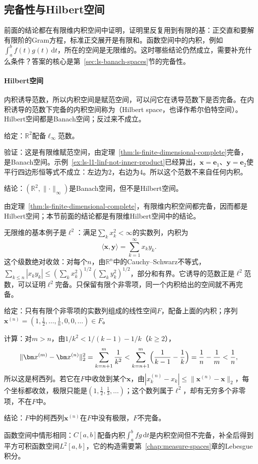 \subsection{完备性与Hilbert空间}
\label{sec:ls-hilbert-spaces}

前面的结论都在有限维内积空间中证明，证明里反复用到有限的基：正交直和要解有限阶的Gram方程，标准正交展开是有限和。函数空间中的内积，例如$\int_a^bf(t)g(t)\,\mathrm dt$，所在的空间是无限维的。这时哪些结论仍然成立，需要补充什么条件？答案的核心是第~\ref{sec:ls-banach-spaces}节的完备性。

\paragraph{Hilbert空间}
内积诱导范数，所以内积空间是赋范空间，可以问它在诱导范数下是否完备。在内积诱导的范数下完备的内积空间称为（Hilbert space，也译作希尔伯特空间）。Hilbert空间都是Banach空间；反过来不成立。
\begin{example}[反例：完备但不来自内积的范数]
\label{ex:ls-banach-not-hilbert}
给定：$\mathbb R^2$配备$\ell_\infty$范数。

验证：这是有限维赋范空间，由定理~\ref{thm:ls-finite-dimensional-complete}完备，是Banach空间。示例~\ref{ex:ls-l1-linf-not-inner-product}已经算出，$\bm x=\bm e_1$、$\bm y=\bm e_2$使平行四边形恒等式不成立：左边为$2$，右边为$4$。所以这个范数不来自任何内积。

结论：$(\mathbb R^2,\lVert\cdot\rVert_\infty)$是Banach空间，但不是Hilbert空间。
\end{example}
由定理~\ref{thm:ls-finite-dimensional-complete}，有限维内积空间都完备，因而都是Hilbert空间；本节前面的结论都是有限维Hilbert空间中的结论。

无限维的基本例子是$\ell^2$：满足$\sum_kx_k^2<\infty$的实数列，内积为
\[
 \langle\bm x,\bm y\rangle=\sum_{k=1}^\infty x_ky_k .
\]
这个级数绝对收敛：对每个$n$，由$\mathbb R^n$中的Cauchy--Schwarz不等式，$\sum_{k\leq n}|x_ky_k|\leq(\sum_kx_k^2)^{1/2}(\sum_ky_k^2)^{1/2}$，部分和有界。它诱导的范数正是$\ell^2$范数，可以证明$\ell^2$完备。只保留有限个非零项，同一个内积给出的空间就不再完备。
\begin{example}[反例：有限非零数列的空间不完备]
\label{ex:ls-finite-sequences-incomplete}
给定：只有有限个非零项的实数列组成的线性空间$F$，配备上面的内积；序列$\bm x^{(n)}=(1,\tfrac12,\ldots,\tfrac1n,0,0,\ldots)\in F$。

计算：对$m>n$，由$1/k^2<1/(k-1)-1/k$（$k\geq2$），
\[
 \lVert\bm x^{(m)}-\bm x^{(n)}\rVert_2^2=\sum_{k=n+1}^m\frac1{k^2}
 <\sum_{k=n+1}^m\Bigl(\frac1{k-1}-\frac1k\Bigr)=\frac1n-\frac1m<\frac1n,
\]
所以这是柯西列。若它在$F$中收敛到某个$\bm x$，由$|x^{(n)}_k-x_k|\leq\lVert\bm x^{(n)}-\bm x\rVert_2$，每个坐标都收敛，极限只能是$(1,\tfrac12,\tfrac13,\ldots)$；这个数列属于$\ell^2$，却有无穷多个非零项，不在$F$中。

结论：$F$中的柯西列$\bm x^{(n)}$在$F$中没有极限，$F$不完备。
\end{example}
函数空间中情形相同：$C[a,b]$配备内积$\int_a^bfg\,\mathrm dt$是内积空间但不完备，补全后得到平方可积函数空间$L^2[a,b]$，它的构造需要第~\ref{chap:measure-spaces}章的Lebesgue积分。


